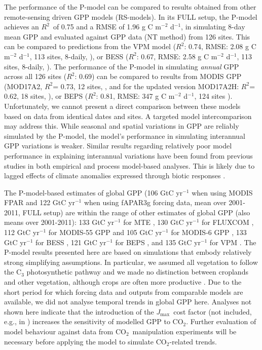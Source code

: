 \documentclass[gmd, manuscript]{copernicus}
\newcommand{\coo}{CO$_2$}
\newcommand{\jmax}{$J_{\text{max}}$}
\newcommand{\rsq}{$R^2$}
\begin{document}
The performance of the P-model can be compared to results obtained from other remote-sensing driven GPP models (RS-models). In its FULL setup, the P-model achieves an \rsq\ of 0.75 and a RMSE of 1.96 g C m$^{-2}$ d$^{-1}$, in simulating 8-day mean GPP and evaluated against GPP data (NT method) from 126 sites. This can be compared to predictions from the VPM model (\rsq : 0.74, RMSE: 2.08 g C m$^{-2}$ d$^{-1}$, 113 sites, 8-daily, \citet{Zhang2017-yr}), or BESS (\rsq : 0.67, RMSE: 2.58 g C m$^{-2}$ d$^{-1}$, 113 sites, 8-daily, \citet{jiang16rse}). The performance of the P-model in simulating \textit{annual} GPP across all 126 sites (\rsq : 0.69) can be compared to results from MODIS GPP (MOD17A2, \rsq = 0.73, 12 sites, \citet{heinsch06}, and for the updated version MOD17A2H: \rsq = 0.62, 18 sites, \citet{wang17rs}), or BEPS (\rsq : 0.81, RMSE: 347 g C m$^{-2}$ d$^{-1}$, 124 sites \citep{he18grl}). Unfortunately, we cannot present a direct comparison between these models based on data from identical dates and sites. A targeted model intercomparison may address this. While seasonal and spatial variations in GPP are reliably simulated by the P-model, the model's performance in simulating interannual GPP variations is weaker. Similar results regarding relatively poor model performance in explaining interannual variations have been found from previous studies in both empirical \citep{richardson07gcb, urbanski07jgr} and process model-based \citep{keenan12gcb, biederman16gcb} analyses. This is likely due to lagged effects of climate anomalies expressed through biotic responses \citep{richardson07gcb, keenan12gcb}.

The P-model-based estimates of global GPP (106 GtC yr$^{-1}$ when using MODIS FPAR and 122 GtC yr$^{-1}$ when using fAPAR3g forcing data, mean over 2001-2011, FULL setup) are within the range of other estimates of global GPP (also means over 2001-2011): 133 GtC yr$^{-1}$ for MTE \citep{jung11jgr}, 130 GtC yr$^{-1}$ for FLUXCOM \citep{tramontana16bg}, 112 GtC yr$^{-1}$ for MODIS-55 GPP and 105 GtC yr$^{-1}$ for MODIS-6 GPP \citep{running04, zhao05}, 133 GtC yr$^{-1}$ for BESS \citep{jiang16rse, ryu11gbc}, 121 GtC yr$^{-1}$ for BEPS \citep{he18grl, chen16agrformet}, and 135 GtC yr$^{-1}$ for VPM \citep{zhang17scidat}. The P-model results presented here are based on simulations that embody relatively strong simplifying assumptions. In particular, we assumed all vegetation to follow the C$_3$ photosynthetic pathway and we made no distinction between croplands and other vegetation, although crops are often more productive \citep{guanter14pnas}. Due to the short period for which forcing data and outputs from comparable models are available, we did not analyse temporal trends in global GPP here. Analyses not shown here indicate that the introduction of the \jmax\ cost factor (not included, e.g., in \citet{keenan17natcomm}) increases the sensitivity of modelled GPP to \coo . Further evaluation of model behaviour against data from \coo\ manipulation experiments will be necessary before applying the model to simulate \coo -related trends.
\end{document}
